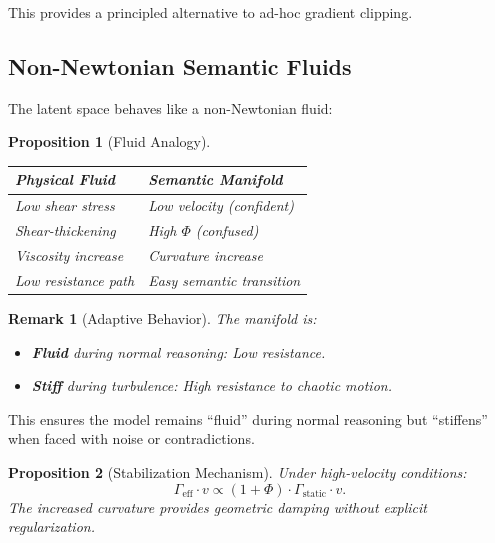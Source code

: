 \documentclass[12pt,letterpaper,twoside]{article}
\newtheorem{remarque}{Remark}[section]
\newtheorem{prop}{Proposition}[section]
\begin{document}
This provides a principled alternative to ad-hoc gradient clipping.

\subsection{Non-Newtonian Semantic Fluids}

The latent space behaves like a non-Newtonian fluid:

\begin{prop}[Fluid Analogy]
\begin{center}
\begin{tabular}{p{}p{}}
\toprule
Physical Fluid & Semantic Manifold \\ \midrule
Low shear stress & Low velocity (confident) \\
Shear-thickening & High $\Phi$ (confused) \\
Viscosity increase & Curvature increase \\
Low resistance path & Easy semantic transition \\ \bottomrule
\end{tabular}
\end{center}
\end{prop}

\begin{remarque}[Adaptive Behavior]
The manifold is:
\begin{itemize}
\item \textbf{Fluid} during normal reasoning: Low resistance.
\item \textbf{Stiff} during turbulence: High resistance to chaotic motion.
\end{itemize}
\end{remarque}

This ensures the model remains ``fluid'' during normal reasoning but ``stiffens'' when faced with noise or contradictions.

\begin{prop}[Stabilization Mechanism]
Under high-velocity conditions:
\[
\Gamma_{\text{eff}} \cdot v \propto (1 + \Phi) \cdot \Gamma_{\text{static}} \cdot v.
\]
The increased curvature provides geometric damping without explicit regularization.
\end{prop}
\end{document}
